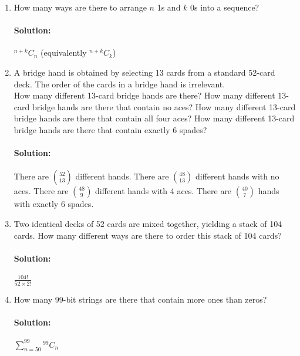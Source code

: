 \documentclass[11pt, notitlepage]{article}
\newcommand*{\Comb}[2]{{}^{#1}C_{#2}}%
\newenvironment{solution}{\paragraph{Solution:}}{\hfill}
\begin{document}
\begin{enumerate}[label=\alph*.)]

\item How many ways are there to arrange $n$ 1s and $k$ 0s into a sequence?
\begin{solution}
	$\Comb{n+k}{n}$ (equivalently $\Comb{n+k}{k}$)
\end{solution}
\item A bridge hand is obtained by selecting 13 cards from a standard
  52-card deck. The order of the cards in a bridge hand is
  irrelevant. \\
  How many different 13-card bridge hands are there? 
  How many different 13-card bridge hands are there that contain
  no aces? How many different 13-card bridge hands are there that contain
  all four aces? How many different 13-card bridge hands are there that contain
  exactly 6 spades?
\begin{solution}
	There are $\binom{52}{13}$ different hands. There are  $\binom{48}{13}$ different hands with no aces. There are $\binom{48}{9}$ different hands with 4 aces. There are $\binom{40}{7}$ hands with exactly 6 spades.
\end{solution}

\item Two identical decks of 52 cards are mixed together, yielding a
  stack of 104 cards.
  How many different ways are there to order this stack of 104 cards?
 \begin{solution}
	$\frac{104!}{52\times 2!}$
\end{solution}

\item How many 99-bit strings are there that contain more ones than
  zeros?
\begin{solution}
	$\sum_{n=50}^{99} \Comb{99}{n}$
\end{solution}
  

\end{enumerate}
\end{document}
